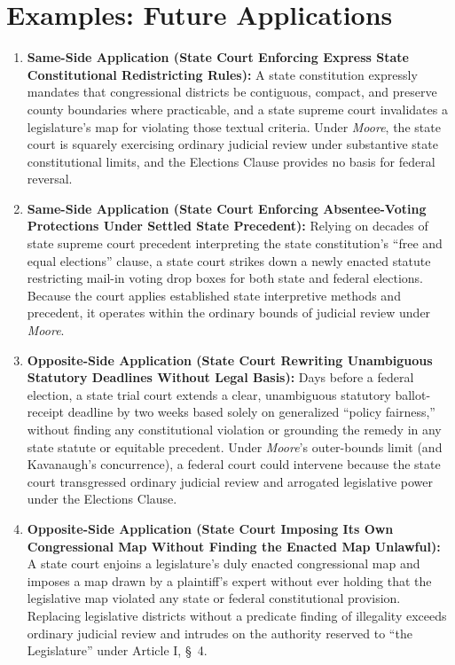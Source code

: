 \documentclass[12pt]{article}
\begin{document}
\section{Examples: Future Applications}
\begin{enumerate}
\item \textbf{Same-Side Application (State Court Enforcing Express State Constitutional Redistricting Rules):} A state constitution expressly mandates that congressional districts be contiguous, compact, and preserve county boundaries where practicable, and a state supreme court invalidates a legislature's map for violating those textual criteria. Under \textit{Moore}, the state court is squarely exercising ordinary judicial review under substantive state constitutional limits, and the Elections Clause provides no basis for federal reversal.

\item \textbf{Same-Side Application (State Court Enforcing Absentee-Voting Protections Under Settled State Precedent):} Relying on decades of state supreme court precedent interpreting the state constitution's ``free and equal elections'' clause, a state court strikes down a newly enacted statute restricting mail-in voting drop boxes for both state and federal elections. Because the court applies established state interpretive methods and precedent, it operates within the ordinary bounds of judicial review under \textit{Moore}.

\item \textbf{Opposite-Side Application (State Court Rewriting Unambiguous Statutory Deadlines Without Legal Basis):} Days before a federal election, a state trial court extends a clear, unambiguous statutory ballot-receipt deadline by two weeks based solely on generalized ``policy fairness,'' without finding any constitutional violation or grounding the remedy in any state statute or equitable precedent. Under \textit{Moore}'s outer-bounds limit (and Kavanaugh's concurrence), a federal court could intervene because the state court transgressed ordinary judicial review and arrogated legislative power under the Elections Clause.

\item \textbf{Opposite-Side Application (State Court Imposing Its Own Congressional Map Without Finding the Enacted Map Unlawful):} A state court enjoins a legislature's duly enacted congressional map and imposes a map drawn by a plaintiff's expert without ever holding that the legislative map violated any state or federal constitutional provision. Replacing legislative districts without a predicate finding of illegality exceeds ordinary judicial review and intrudes on the authority reserved to ``the Legislature'' under Article I, \S~4.


\end{enumerate}
\end{document}
